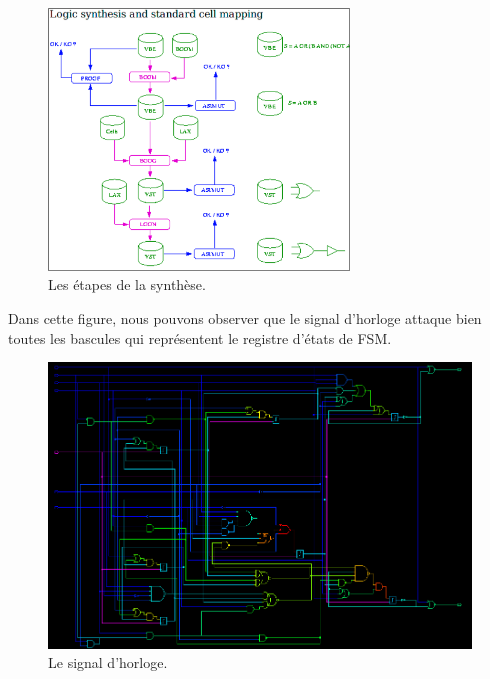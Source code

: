 \documentclass[12pt]{article}
\begin{document}
\begin{enumerate}
\begin{figure}
\begin{center}
  \includegraphics[width = 8cm]{pic/process.png}
\end{center}
\caption{Les étapes de la synthèse.}
\end{figure}

\end{enumerate}
Dans cette figure, nous pouvons observer que le signal d'horloge attaque bien toutes les bascules qui représentent le registre d'états de FSM.
\begin{figure}
\begin{center}
  \includegraphics[width = 12cm]{pic/clk.png}
\end{center}
\caption{Le signal d'horloge.}
\end{figure}
\end{document}
